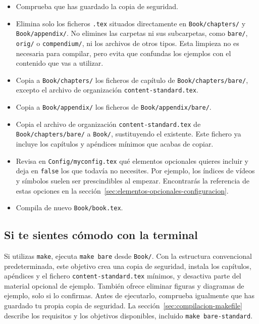 \begin{itemize}
  \item Comprueba que has guardado la copia de seguridad.
  \item Elimina solo los ficheros \texttt{.tex} situados directamente en \texttt{Book/chapters/} y \texttt{Book/appendix/}. No elimines las carpetas ni sus subcarpetas, como \texttt{bare/}, \texttt{orig/} o \texttt{compendium/}, ni los archivos de otros tipos. Esta limpieza no es necesaria para compilar, pero evita que confundas los ejemplos con el contenido que vas a utilizar.
  \item Copia a \texttt{Book/chapters/} los ficheros de capítulo de \texttt{Book/chapters/bare/}, excepto el archivo de organización \texttt{content-standard.tex}.
  \item Copia a \texttt{Book/appendix/} los ficheros de \texttt{Book/appendix/bare/}.
  \item Copia el archivo de organización \texttt{content-standard.tex} de \texttt{Book/chapters/bare/} a \texttt{Book/}, sustituyendo el existente. Este fichero ya incluye los capítulos y apéndices mínimos que acabas de copiar.
  \item Revisa en \texttt{Config/myconfig.tex} qué elementos opcionales quieres incluir y deja en \texttt{false} los que todavía no necesites. Por ejemplo, los índices de vídeos y símbolos suelen ser prescindibles al empezar. Encontrarás la referencia de estas opciones en la sección~\ref{sec:elementos-opcionales-configuracion}.
  \item Compila de nuevo \texttt{Book/book.tex}.
\end{itemize}

\subsection{Si te sientes cómodo con la terminal}
\label{sec:estructura-minima-make}

Si utilizas \texttt{make}, ejecuta \texttt{make bare} desde \texttt{Book/}. Con la estructura convencional predeterminada, este objetivo crea una copia de seguridad, instala los capítulos, apéndices y el fichero \texttt{content-standard.tex} mínimos, y desactiva parte del material opcional de ejemplo. También ofrece eliminar figuras y diagramas de ejemplo, solo si lo confirmas. Antes de ejecutarlo, comprueba igualmente que has guardado tu propia copia de seguridad. La sección~\ref{sec:compilacion-makefile} describe los requisitos y los objetivos disponibles, incluido \texttt{make bare-standard}.

